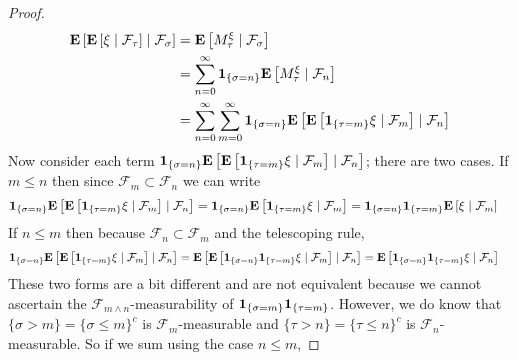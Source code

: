 \documentclass{amsart}
\theoremstyle{remark}
\theoremstyle{definition}
\begin{document}
\begin{proof}
\begin{align*}
\cexpectationlong{\mathcal{F}_\sigma}{\cexpectationlong{\mathcal{F}_\tau}{\xi}}
&=
\cexpectationlong{\mathcal{F}_\sigma}{M^\xi_\tau}
\\
&= \sum_{n=0}^\infty \characteristic{\lbrace \sigma = n \rbrace}
\cexpectationlong{\mathcal{F}_n}{M^\xi_\tau} \\
&= \sum_{n=0}^\infty \sum_{m=0}^\infty \characteristic{\lbrace \sigma = n \rbrace}
\cexpectationlong{\mathcal{F}_n}{\cexpectationlong{\mathcal{F}_m}{\characteristic{
    \lbrace \tau = m \rbrace } \xi}} \\
\end{align*}
Now consider each term $\characteristic{\lbrace \sigma = n \rbrace}
\cexpectationlong{\mathcal{F}_n}{\cexpectationlong{\mathcal{F}_m}{\characteristic{
    \lbrace \tau = m \rbrace } \xi}}$; there are two cases. If $m \leq n$
then since $\mathcal{F}_m \subset \mathcal{F}_n$ we can write
\begin{align*}
\characteristic{\lbrace \sigma = n \rbrace}
\cexpectationlong{\mathcal{F}_n}{\cexpectationlong{\mathcal{F}_m}{\characteristic{
    \lbrace \tau = m \rbrace } \xi}} &= \characteristic{\lbrace \sigma = n \rbrace}\cexpectationlong{\mathcal{F}_m}{\characteristic{
    \lbrace \tau = m \rbrace } \xi} = \characteristic{\lbrace \sigma = n \rbrace}\characteristic{
    \lbrace \tau = m \rbrace }\cexpectationlong{\mathcal{F}_m}{ \xi} 
\end{align*}
If $n \leq m$ then because $\mathcal{F}_n \subset \mathcal{F}_m$ and
the telescoping rule,
\begin{align*}
\characteristic{\lbrace \sigma = n \rbrace}
\cexpectationlong{\mathcal{F}_n}{\cexpectationlong{\mathcal{F}_m}{\characteristic{
    \lbrace \tau = m \rbrace } \xi}} &= 
\cexpectationlong{\mathcal{F}_n}{\cexpectationlong{\mathcal{F}_m}{\characteristic{\lbrace
      \sigma = n \rbrace} \characteristic{
    \lbrace \tau = m \rbrace } \xi}}  = \cexpectationlong{\mathcal{F}_n}{\characteristic{\lbrace \sigma = n \rbrace}\characteristic{
    \lbrace \tau = m \rbrace } \xi} 
\end{align*}
These two forms are a bit different and are not equivalent because we
cannot ascertain the $\mathcal{F}_{m \wedge n}$-measurability of $\characteristic{\lbrace \sigma = m \rbrace}\characteristic{
    \lbrace \tau = m \rbrace }$.  However, we do know that $\lbrace
  \sigma > m \rbrace = \lbrace \sigma \leq m \rbrace^c$ is
  $\mathcal{F}_m$-measurable and $\lbrace
  \tau > n \rbrace = \lbrace \tau \leq n \rbrace^c$ is
  $\mathcal{F}_n$-measurable.  So if we sum using the case $n \leq m$,

\end{proof}
\end{document}
